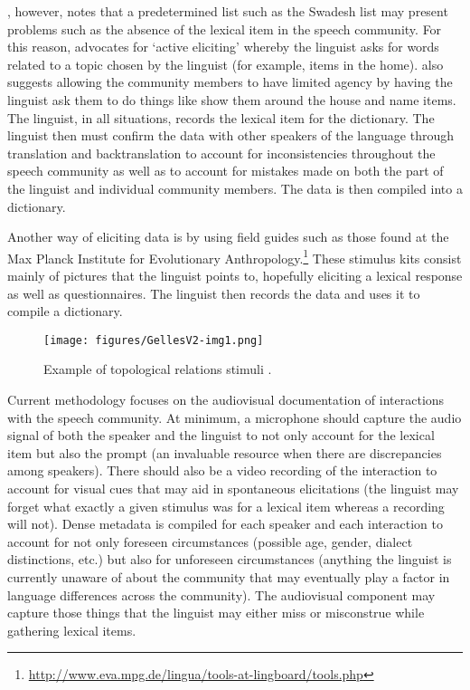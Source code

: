 \documentclass[output=paper,
modfonts
]{langscibook}
\begin{document}
\citet{Mosel2004}, however, notes that a predetermined list such as the Swadesh list may present problems such as the absence of the lexical item in the speech community. For this reason, \citet{Mosel2004} advocates for ‘active eliciting’ whereby the linguist asks for words related to a topic chosen by the linguist (for example, items in the home). \citet{Bowern2008} also suggests allowing the community members to have limited agency by having the linguist ask them to do things like show them around the house and name items. The linguist, in all situations, records the lexical item for the dictionary. The linguist then must confirm the data with other speakers of the language through translation and backtranslation to account for inconsistencies throughout the speech community as well as to account for mistakes made on both the part of the linguist and individual community members. The data is then compiled into a dictionary. 

Another way of eliciting data is by using field guides such as those found at the Max Planck Institute for Evolutionary Anthropology.\footnote{ \url{http://www.eva.mpg.de/lingua/tools-at-lingboard/tools.php}} These stimulus kits consist mainly of pictures that the linguist points to, hopefully eliciting a lexical response as well as questionnaires. The linguist then records the data and uses it to compile a dictionary. 

\begin{figure} 
\texttt{[image: figures/GellesV2-img1.png]}
\caption{Example of topological relations stimuli \citep{BowermanPederson1992}.}
\label{fig:gelles:2}
\end{figure}

Current  methodology focuses on the audiovisual documentation of interactions with the speech community. At minimum, a microphone should capture the audio signal of both the speaker and the linguist to not only account for the lexical item but also the prompt (an invaluable resource when there are discrepancies among speakers). There should also be a video recording of the interaction to account for visual cues that may aid in spontaneous elicitations (the linguist may forget what exactly a given stimulus was for a lexical item whereas a recording will not). Dense metadata is compiled for each speaker and each interaction to account for not only foreseen circumstances (possible age, gender, dialect distinctions, etc.) but also for unforeseen circumstances (anything the linguist is currently unaware of about the community that may eventually play a factor in language differences across the community). The audiovisual component may capture those things that the linguist may either miss or misconstrue while gathering lexical items. 
\end{document}
